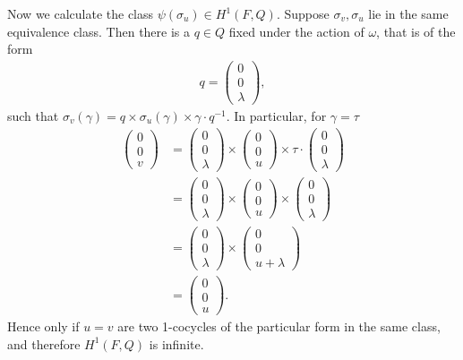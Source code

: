 Now we calculate the class $\psi(\sigma_u) \in H^1(F, Q)$. Suppose $\sigma_v,\sigma_u$ lie in the same equivalence class. Then
there is a $q\in Q$ fixed under the action of $\omega$, that is of the form
\begin{align*}
	q = \left(\begin{matrix} 0 \\ 0 \\ \lambda\end{matrix}\right),
\end{align*}
such that $\sigma_v(\gamma) = q\times\sigma_u(\gamma)\times\gamma\cdot q^{-1}$. In particular, for $\gamma = \tau$
\begin{align*}
	\left(\begin{matrix} 0 \\ 0 \\ v\end{matrix}\right) &=
	\left(\begin{matrix} 0 \\ 0 \\ \lambda\end{matrix}\right) \times
	\left(\begin{matrix} 0 \\ 0 \\ u\end{matrix}\right) \times
	\tau\cdot\left(\begin{matrix} 0 \\ 0 \\ \lambda\end{matrix}\right)\\
	&=
	\left(\begin{matrix} 0 \\ 0 \\ \lambda\end{matrix}\right) \times
	\left(\begin{matrix} 0 \\ 0 \\ u\end{matrix}\right) \times
	\left(\begin{matrix} 0 \\ 0 \\ \lambda\end{matrix}\right)\\
	&=
	\left(\begin{matrix} 0 \\ 0 \\ \lambda\end{matrix}\right) \times
	\left(\begin{matrix} 0 \\ 0 \\ u + \lambda\end{matrix}\right) \\
	&=
	\left(\begin{matrix} 0 \\ 0 \\ u\end{matrix}\right).
\end{align*}
Hence only if $u=v$ are two 1-cocycles of the particular form in the same class, and therefore $H^1(F, Q)$ is infinite.

